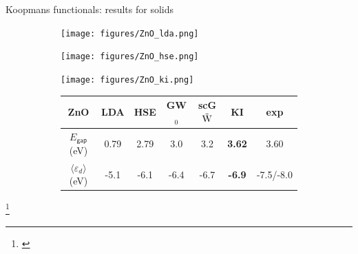 \documentclass[xcolor=table,aspectratio=169]{beamer}
\newcommand\blfootcite[1]{%
  \begingroup
  \renewcommand\thefootnote{}\footnote{\hspace{-4ex}\cite{#1}}%
  \addtocounter{footnote}{-1}%
  \endgroup
}
\numberwithin{equation}{section}
\begin{document}
\begin{frame}{Koopmans functionals: results for solids}
   \begin{figure}[t]
      \centering
      \begin{subfigure}{0.3\textwidth}
         \texttt{[image: figures/ZnO\_lda.png]}
      \end{subfigure}
      \begin{subfigure}{0.3\textwidth}
         \texttt{[image: figures/ZnO\_hse.png]}
      \end{subfigure}
      \begin{subfigure}{0.3\textwidth}
         \texttt{[image: figures/ZnO\_ki.png]}
      \end{subfigure}
      \begin{subfigure}{\textwidth} %
         \centering
         \begin{tabular}{c S[table-format = 2.2] S[table-format = 2.2] S[table-format = 2.2] S[table-format = 2.2] >{\color{seaborn_red}\bfseries}S[table-format = 2.2] S[table-format = 2.2]}
            ZnO                                  & {LDA} & {HSE} & {GW$_0$} & {scG$\tilde{\rm W}$} & {KI} & {exp}       \\
            \hline
            $E_\mathsf{gap}$ (eV)                & 0.79  & 2.79  & 3.0      & 3.2                  & 3.62 & 3.60        \\
            $\langle \varepsilon_d \rangle$ (eV) & -5.1  & -6.1  & -6.4     & -6.7                 & -6.9 & {-7.5/-8.0} \\
         \end{tabular}
      \end{subfigure}
   \end{figure}
   \blfootcite{Colonna2022}
\end{frame}
\end{document}
